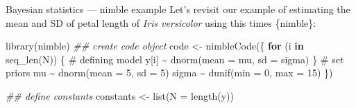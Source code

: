 \documentclass[
  ignorenonframetext,
  aspectratio=169,
  t]{beamer}
\newenvironment{Shaded}{\begin{snugshade}}{\end{snugshade}}
\newcommand{\AttributeTok}[1]{\textcolor[rgb]{0.40,0.45,0.13}{#1}}
\newcommand{\CommentTok}[1]{\textcolor[rgb]{0.37,0.37,0.37}{#1}}
\newcommand{\ControlFlowTok}[1]{\textcolor[rgb]{0.00,0.23,0.31}{\textbf{#1}}}
\newcommand{\DecValTok}[1]{\textcolor[rgb]{0.68,0.00,0.00}{#1}}
\newcommand{\DocumentationTok}[1]{\textcolor[rgb]{0.37,0.37,0.37}{\textit{#1}}}
\newcommand{\FunctionTok}[1]{\textcolor[rgb]{0.28,0.35,0.67}{#1}}
\newcommand{\NormalTok}[1]{\textcolor[rgb]{0.00,0.23,0.31}{#1}}
\newcommand{\OtherTok}[1]{\textcolor[rgb]{0.00,0.23,0.31}{#1}}
\newcommand{\SpecialCharTok}[1]{\textcolor[rgb]{0.37,0.37,0.37}{#1}}
\begin{document}
\begin{frame}[fragile]{Bayesian statistics --- nimble example}
\protect{}\label{bayesian-statistics-nimble-example}
Let's revisit our example of estimating the mean and SD of petal length
of \emph{Iris versicolor} using this times \{nimble\}:

\footnotesize

\begin{Shaded}
\begin{Highlighting}[]
\FunctionTok{library}\NormalTok{(nimble)}
\DocumentationTok{\#\# create code object}
\NormalTok{code }\OtherTok{\textless{}{-}} \FunctionTok{nimbleCode}\NormalTok{(\{ }
  \ControlFlowTok{for}\NormalTok{ (i }\ControlFlowTok{in} \FunctionTok{seq\_len}\NormalTok{(N)) \{ }\CommentTok{\# defining model}
\NormalTok{      y[i] }\SpecialCharTok{\textasciitilde{}} \FunctionTok{dnorm}\NormalTok{(}\AttributeTok{mean =}\NormalTok{ mu, }\AttributeTok{sd =}\NormalTok{ sigma)}
\NormalTok{  \}}
  \CommentTok{\# set priors}
\NormalTok{  mu }\SpecialCharTok{\textasciitilde{}} \FunctionTok{dnorm}\NormalTok{(}\AttributeTok{mean =} \DecValTok{5}\NormalTok{, }\AttributeTok{sd =} \DecValTok{5}\NormalTok{)}
\NormalTok{  sigma }\SpecialCharTok{\textasciitilde{}} \FunctionTok{dunif}\NormalTok{(}\AttributeTok{min =} \DecValTok{0}\NormalTok{, }\AttributeTok{max =} \DecValTok{15}\NormalTok{)}
\NormalTok{\})}

\DocumentationTok{\#\# define constants}
\NormalTok{constants }\OtherTok{\textless{}{-}} \FunctionTok{list}\NormalTok{(}\AttributeTok{N =} \FunctionTok{length}\NormalTok{(y))}
\end{Highlighting}
\end{Shaded}

\normalsize
\end{frame}
\end{document}
